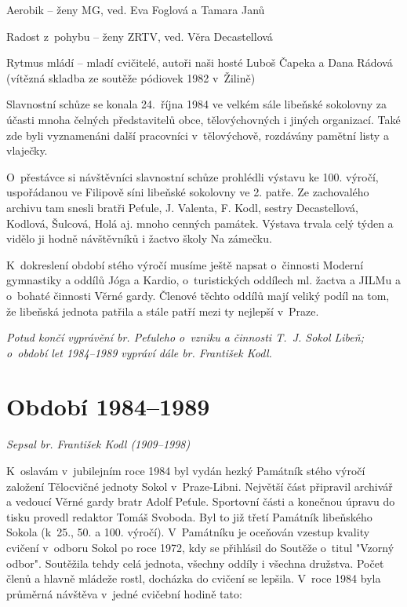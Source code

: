 \documentclass[a5paper, 11pt, twoside]{article}
\begin{document}
\noindent Aerobik -- ženy MG, ved. Eva Foglová a Tamara Janů

\noindent Radost z~pohybu -- ženy ZRTV, ved. Věra Decastellová

\noindent Rytmus mládí -- mladí cvičitelé, autoři naši hosté Luboš Čapeka a
Dana Rádová (vítězná skladba ze soutěže pódiovek 1982 v~Žilině)

\smallskip
Slavnostní schůze se konala 24.~října 1984 ve velkém sále libeňské
sokolovny za účasti mnoha čelných představitelů obce, tělovýchovných i
jiných organizací. Také zde byli vyznamenáni další pracovníci
v~tělovýchově, rozdávány pamětní listy a vlaječky.

O~přestávce si návštěvníci slavnostní schůze prohlédli výstavu ke 100.
výročí, uspořádanou ve Filipově síni libeňské sokolovny ve 2. patře. Ze
zachovalého archivu tam snesli bratři Peťule, J. Valenta, F. Kodl,
sestry Decastellová, Kodlová, Šulcová, Holá aj. mnoho cenných památek.
Výstava trvala celý týden a vidělo ji hodně návštěvníků i žactvo školy
Na zámečku.

K~dokreslení období stého výročí musíme ještě napsat o~činnosti Moderní
gymnastiky a oddílů Jóga a Kardio, o~turistických oddílech ml. žactva a
JILMu a o~bohaté činnosti Věrné gardy. Členové těchto oddílů mají veliký
podíl na tom, že libeňská jednota patřila a stále patří mezi ty nejlepší
v~Praze.

\begin{center}
\textit{Potud končí vyprávění br. Peťuleho o~vzniku a činnosti T.~J. Sokol
Libeň; o~období let 1984--1989 vypráví dále br. František Kodl.}
\end{center}

\section{Období 1984--1989}

\begin{center}
  \textit{Sepsal br. František Kodl (1909--1998)}
\end{center}

\noindent
K~oslavám v~jubilejním roce 1984 byl vydán hezký Památník stého výročí
založení Tělocvičné jednoty Sokol v~Praze-Libni. Největší část připravil
archivář a vedoucí Věrné gardy bratr Adolf Peťule. Sportovní části a
konečnou úpravu do tisku provedl redaktor Tomáš Svoboda. Byl to již
třetí Památník libeňského Sokola (k~25., 50. a 100. výročí). V~Památníku
je oceňován vzestup kvality cvičení v~odboru Sokol po roce 1972, kdy se
přihlásil do Soutěže o~titul "Vzorný odbor". Soutěžila tehdy celá
jednota, všechny oddíly i všechna družstva. Počet členů a hlavně mládeže
rostl, docházka do cvičení se lepšila. V~roce 1984 byla průměrná
návštěva v~jedné cvičební hodině tato:
\end{document}

